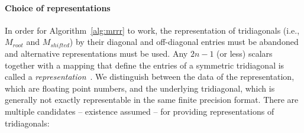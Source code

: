 \documentclass[final]{siamltex}
\begin{document}
\paragraph{Choice of representations}
In order for Algorithm~\ref{alg:mrrr} 
to work, the representation of tridiagonals (i.e., $M_{root}$ and
$M_{shifted}$) by their diagonal and off-diagonal entries must be abandoned
and alternative representations must be used. Any $2n-1$ (or less) scalars
together with a mapping that define the entries of a symmetric tridiagonal
is called a {\it representation}~\cite{Willems:framework}. We distinguish 
between the data of the representation, which are floating point numbers,
and the underlying tridiagonal, which is generally not exactly representable
 in the same finite precision format. There are multiple candidates
-- existence assumed -- for providing representations of tridiagonals:
\end{document}
